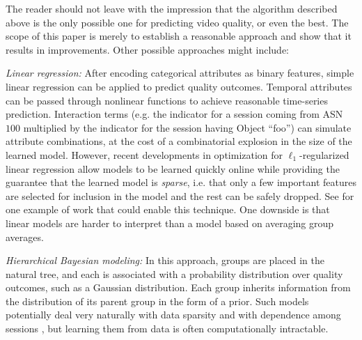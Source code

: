 The reader should not leave with the impression that the algorithm described above is the only possible one for predicting video quality, or even the best.  The scope of this paper is merely to establish a reasonable approach and show that it results in improvements.  Other possible approaches might include:
\begin{packedenumerate}
  \item \emph{Linear regression:} After encoding categorical attributes as binary features, simple linear regression can be applied to predict quality outcomes.  Temporal attributes can be passed through nonlinear functions to achieve reasonable time-series prediction.  Interaction terms (e.g. the indicator for a session coming from ASN $100$ multiplied by the indicator for the session having Object ``foo'') can simulate attribute combinations, at the cost of a combinatorial explosion in the size of the learned model.  However, recent developments in optimization for $\ell_1$-regularized linear regression allow models to be learned quickly online while providing the guarantee that the learned model is \emph{sparse}, i.e. that only a few important features are selected for inclusion in the model and the rest can be safely dropped.  See \cite{duchi2010composite} for one example of work that could enable this technique.  One downside is that linear models are harder to interpret than a model based on averaging group averages.
  \item \emph{Hierarchical Bayesian modeling:} In this approach, groups are placed in the natural tree, and each is associated with a probability distribution over quality outcomes, such as a Gaussian distribution.  Each group inherits information from the distribution of its parent group in the form of a prior.  Such models potentially deal very naturally with data sparsity and with dependence among sessions \cite{gelman2003bayesian}, but learning them from data is often computationally intractable.
\end{packedenumerate}